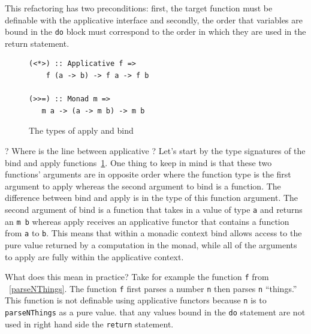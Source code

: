 This refactoring has two \DIFdelbegin {}\DIFdelend \DIFaddbegin {}\DIFaddend preconditions: first, the target function must be definable with the applicative interface \DIFdelbegin {}\DIFdelend \DIFaddbegin {}\DIFaddend and secondly, the order that variables are bound in the \texttt{do} block must correspond to the order in which they are used in the return statement.

\begin{figure}[t]
\begin{lstlisting}
(<*>) :: Applicative f => 
	f (a -> b) -> f a -> f b

(>>=) :: Monad m => 
   m a -> (a -> m b) -> m b
\end{lstlisting}
\caption{The types of apply and bind}
\label{appBind}
\end{figure} 

\DIFdelbegin {}\DIFdelend \DIFaddbegin {}\DIFaddend ? Where is the line between applicative \DIFdelbegin {}\DIFdelend \DIFaddbegin {}\DIFaddend ? Let's start by \DIFdelbegin {}\DIFdelend \DIFaddbegin {}\DIFaddend the type signatures of the bind and apply functions\DIFdelbegin {}\DIFdelend \DIFaddbegin {}\DIFaddend ~\ref{appBind}. One thing to keep in mind is that these two functions' arguments are in opposite order where the function type is the first argument to apply whereas the second argument to bind is a function. The difference between bind and apply is in the type of this function argument. The second argument of bind is a function that takes in a value of type \texttt{a} and returns an \texttt{m b} whereas apply receives an applicative functor that contains a function from \texttt{a} to \texttt{b}. This means that within a monadic context bind allows access to the pure value returned by a computation in the monad, while all of the arguments to apply are fully within the applicative context.

What does this mean in practice? Take for example the function \texttt{f} from \DIFdelbegin {}\DIFdelend \DIFaddbegin {}\DIFaddend ~\ref{parseNThings}. The function \texttt{f} first parses a number \texttt{n} then parses \texttt{n} ``things.'' This function is not definable using applicative functors because \texttt{n} is \DIFdelbegin {}\DIFdelend \DIFaddbegin {}\DIFaddend to \texttt{parseNThings} as a pure value. \DIFdelbegin {}\DIFdelend \DIFaddbegin {}\DIFaddend that any values bound in the \texttt{do} statement are not used in \DIFdelbegin {}\DIFdelend \DIFaddbegin {}\DIFaddend right hand side \DIFdelbegin {}\DIFdelend \DIFaddbegin {}\DIFaddend the \texttt{return} statement. 


